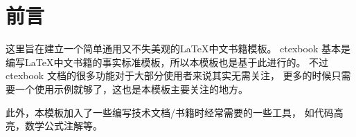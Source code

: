 \chapter{前言}
这里旨在建立一个简单通用又不失美观的\LaTeX 中文书籍模板。
ctexbook 基本是编写\LaTeX 中文书籍的事实标准模板，所以本模板也是基于此进行的。
不过 ctexbook 文档的很多功能对于大部分使用者来说其实无需关注，
更多的时候只需要一个使用示例就够了，这也是本模板主要关注的地方。


此外，本模板加入了一些编写技术文档/书籍时经常需要的一些工具，
如代码高亮，数学公式注解等。
